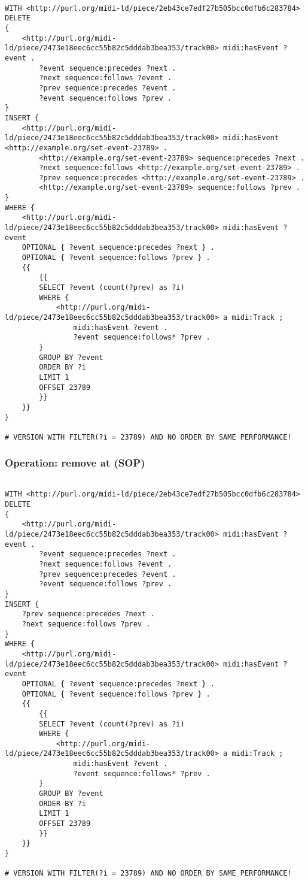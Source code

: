 \begin{lstlisting}[language=sparql]

WITH <http://purl.org/midi-ld/piece/2eb43ce7edf27b505bcc0dfb6c283784>
DELETE
{
	<http://purl.org/midi-ld/piece/2473e18eec6cc55b82c5dddab3bea353/track00> midi:hasEvent ?event .
		?event sequence:precedes ?next .
		?next sequence:follows ?event .
		?prev sequence:precedes ?event .
		?event sequence:follows ?prev .
}
INSERT {
	<http://purl.org/midi-ld/piece/2473e18eec6cc55b82c5dddab3bea353/track00> midi:hasEvent <http://example.org/set-event-23789> .
		<http://example.org/set-event-23789> sequence:precedes ?next .
		?next sequence:follows <http://example.org/set-event-23789> .
		?prev sequence:precedes <http://example.org/set-event-23789> .
		<http://example.org/set-event-23789> sequence:follows ?prev .
}
WHERE {
	<http://purl.org/midi-ld/piece/2473e18eec6cc55b82c5dddab3bea353/track00> midi:hasEvent ?event 
	OPTIONAL { ?event sequence:precedes ?next } .
	OPTIONAL { ?event sequence:follows ?prev } .
	{{
		{{
		SELECT ?event (count(?prev) as ?i)
		WHERE {
			<http://purl.org/midi-ld/piece/2473e18eec6cc55b82c5dddab3bea353/track00> a midi:Track ;
				midi:hasEvent ?event .
				?event sequence:follows* ?prev .
		} 
		GROUP BY ?event
		ORDER BY ?i
		LIMIT 1
		OFFSET 23789
		}}
	}}
}

# VERSION WITH FILTER(?i = 23789) AND NO ORDER BY SAME PERFORMANCE!

\end{lstlisting}

\subsubsection{Operation: remove at (SOP)}
\label{query:SOP:remove_at}

\begin{lstlisting}[language=sparql]

WITH <http://purl.org/midi-ld/piece/2eb43ce7edf27b505bcc0dfb6c283784>
DELETE
{
	<http://purl.org/midi-ld/piece/2473e18eec6cc55b82c5dddab3bea353/track00> midi:hasEvent ?event .
		?event sequence:precedes ?next .
		?next sequence:follows ?event .
		?prev sequence:precedes ?event .
		?event sequence:follows ?prev .
}
INSERT {
	?prev sequence:precedes ?next .
	?next sequence:follows ?prev .
}
WHERE {
	<http://purl.org/midi-ld/piece/2473e18eec6cc55b82c5dddab3bea353/track00> midi:hasEvent ?event 
	OPTIONAL { ?event sequence:precedes ?next } .
	OPTIONAL { ?event sequence:follows ?prev } .
	{{
		{{
		SELECT ?event (count(?prev) as ?i)
		WHERE {
			<http://purl.org/midi-ld/piece/2473e18eec6cc55b82c5dddab3bea353/track00> a midi:Track ;
				midi:hasEvent ?event .
				?event sequence:follows* ?prev .
		} 
		GROUP BY ?event
		ORDER BY ?i
		LIMIT 1
		OFFSET 23789
		}}
	}}
}

# VERSION WITH FILTER(?i = 23789) AND NO ORDER BY SAME PERFORMANCE!

\end{lstlisting}


